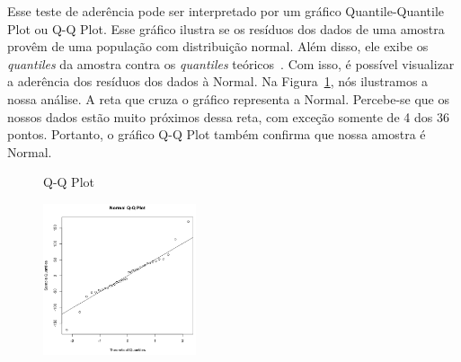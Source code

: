 Esse teste de aderência pode ser interpretado por um gráfico Quantile-Quantile Plot ou Q-Q Plot. Esse gráfico ilustra se os resíduos dos dados de uma amostra provêm de uma população com distribuição normal. Além disso, ele exibe os \emph{quantiles} da amostra contra os \emph{quantiles} teóricos~\cite{Wilk1968}. Com isso, é possível visualizar a aderência dos resíduos dos dados à Normal. Na Figura~\ref{fig:grafico1}, nós ilustramos a nossa análise. A reta que cruza o gráfico representa a Normal. Percebe-se que os nossos dados estão muito próximos dessa reta, com exceção somente de 4 dos 36 pontos. Portanto, o gráfico Q-Q Plot também confirma que nossa amostra é Normal.

\begin{figure}[t]
	\caption{Q-Q Plot}
    \centering
    \includegraphics[width=0.4\textwidth]{images/qqplot.png}
    \caption{}
    \label{fig:grafico1}
\end{figure}